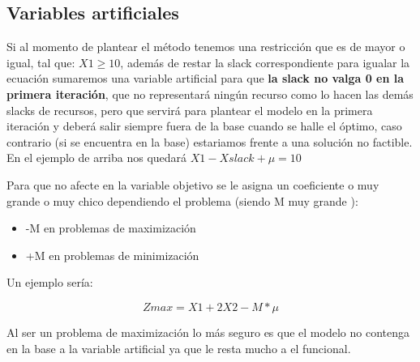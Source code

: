 \documentclass[titlepage,a4paper]{article}
\begin{document}
\subsection{Variables artificiales}

Si al momento de plantear el método tenemos una restricción que es de mayor o igual, tal que: $X1 \geq 10$, además de restar la slack correspondiente para igualar la ecuación sumaremos una variable artificial para que \textbf{la slack no valga 0 en la primera iteración}, que no representará ningún recurso como lo hacen las demás slacks de recursos, pero que servirá para plantear el modelo en la primera iteración y deberá salir siempre fuera de la base cuando se halle el óptimo, caso contrario (si se encuentra en la base) estariamos frente a una solución no factible.
En el ejemplo de arriba nos quedará $X1 - Xslack + \mu = 10$

Para que no afecte en la variable objetivo se le asigna un coeficiente o muy grande o muy chico dependiendo el problema (siendo M muy grande ):

\begin{itemize}
    \item -M en problemas de maximización 
    \item +M en problemas de minimización
\end{itemize}

Un ejemplo sería:

$$Zmax = X1 +2X2 - M*\mu$$

Al ser un problema de maximización lo más seguro es que el modelo no contenga en la base a la variable artificial ya que le resta mucho a el funcional.

\vspace{0.5cm}



\end{document}
